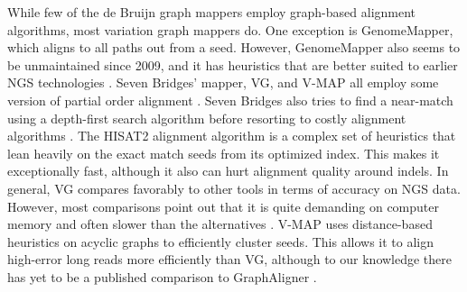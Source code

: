 While few of the de Bruijn graph mappers employ graph-based alignment algorithms, most variation graph mappers do. One exception is GenomeMapper, which aligns to all paths out from a seed. However, GenomeMapper also seems to be unmaintained since 2009, and it has heuristics that are better suited to earlier NGS technologies \cite{Schneeberger_2009}. 
Seven Bridges' mapper, VG, and V-MAP all employ some version of partial order alignment \cite{Rakocevic_2019, Garrison_2019, Vaddadi_2019}. 
Seven Bridges also tries to find a near-match using a depth-first search algorithm before resorting to costly alignment algorithms \cite{Rakocevic_2019}. 
The HISAT2 alignment algorithm is a complex set of heuristics that lean heavily on the exact match seeds from its optimized index. 
This makes it exceptionally fast, although it also can hurt alignment quality around indels. 
In general, VG compares favorably to other tools in terms of accuracy on NGS data. However, most comparisons point out that it is quite demanding on computer memory and often slower than the alternatives \cite{Kim_2019, Vaddadi_2019}. 
V-MAP uses distance-based heuristics on acyclic graphs to efficiently cluster seeds. 
This allows it to align high-error long reads more efficiently than VG, although to our knowledge there has yet to be a published comparison to GraphAligner \cite{Vaddadi_2019}.

%
%


